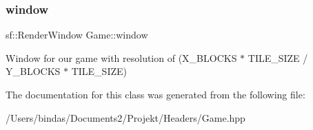 \subsubsection{\texorpdfstring{window}{window}}
{\footnotesize\ttfamily sf\+::\+Render\+Window Game\+::window\hspace{0.3cm}{\ttfamily [private]}}

Window for our game with resolution of (X\+\_\+\+B\+L\+O\+C\+KS $\ast$ T\+I\+L\+E\+\_\+\+S\+I\+ZE / Y\+\_\+\+B\+L\+O\+C\+KS $\ast$ T\+I\+L\+E\+\_\+\+S\+I\+ZE) 

The documentation for this class was generated from the following file\+:\begin{DoxyCompactItemize}
\item 
/\+Users/bindas/\+Documents2/\+Projekt/\+Headers/Game.\+hpp\end{DoxyCompactItemize}
